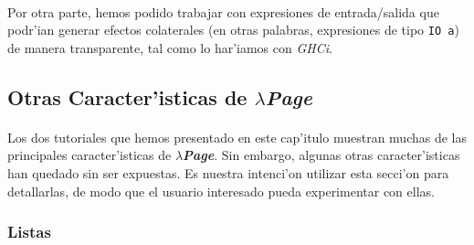 \documentclass[a4paper]{article}
\newcommand{\hpage}{\textbf{\textsl{$\lambda$Page}}}
\begin{document}
\paragraph{}Por otra parte, hemos podido trabajar con expresiones de entrada/salida que podr'ian generar efectos colaterales (en otras palabras, expresiones de tipo \texttt{IO a}) de manera transparente, tal como lo har'iamos con \textsl{GHCi}.

\newpage
\subsection{Otras Caracter'isticas de \hpage}
\begin{epigraphs}
\end{epigraphs}
\paragraph{}Los dos tutoriales que hemos presentado en este cap'itulo muestran muchas de las principales caracter'isticas de \hpage.  Sin embargo, algunas otras caracter'isticas han quedado sin ser expuestas.  Es nuestra intenci'on utilizar esta secci'on para detallarlas, de modo que el usuario interesado pueda experimentar con ellas.
\subsubsection{Listas}
\end{document}
